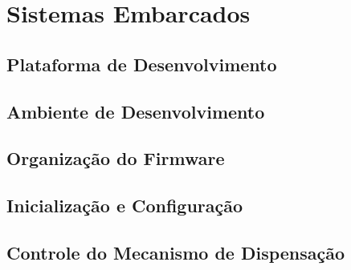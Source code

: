 
\chapter{Sistemas Embarcados}
\label{chap:embarcados}


\section{Plataforma de Desenvolvimento}
\label{sec:plataforma-embarcada}


\section{Ambiente de Desenvolvimento}
\label{sec:ambiente-embarcado}


\section{Organização do Firmware}
\label{sec:organizacao-firmware}


\section{Inicialização e Configuração}
\label{sec:inicializacao}


\section{Controle do Mecanismo de Dispensação}
\label{sec:controle-dispensacao}


